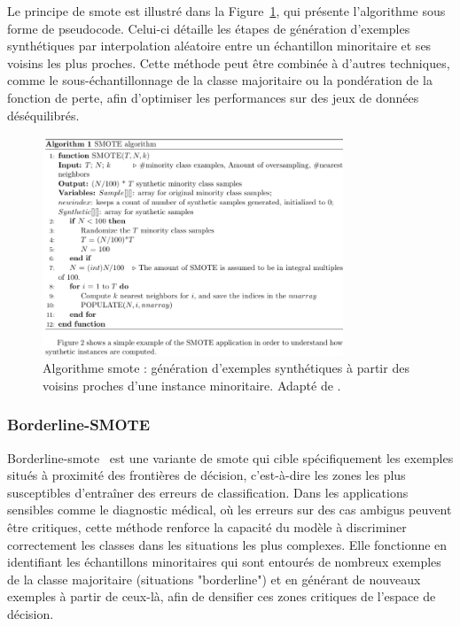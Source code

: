 \documentclass[12pt]{report}
\begin{document}
Le principe de \gls{smote} est illustré dans la Figure~\ref{fig:smote_algo}, qui présente l'algorithme sous forme de pseudocode. Celui-ci détaille les étapes de génération d'exemples synthétiques par interpolation aléatoire entre un échantillon minoritaire et ses voisins les plus proches. Cette méthode peut être combinée à d’autres techniques, comme le sous-échantillonnage de la classe majoritaire ou la pondération de la fonction de perte, afin d’optimiser les performances sur des jeux de données déséquilibrés.

\begin{figure}[H]
    \centering
    \includegraphics[width=0.8\textwidth]{smote.png}
    \caption{Algorithme \gls{smote} : génération d'exemples synthétiques à partir des voisins proches d'une instance minoritaire. Adapté de \cite{chawla2002smote}.}
    \label{fig:smote_algo}
\end{figure}

\subsubsection{Borderline-SMOTE}

Borderline-\gls{smote}~\cite{han2005borderline} est une variante de \gls{smote} qui cible spécifiquement les exemples situés à proximité des frontières de décision, c’est-à-dire les zones les plus susceptibles d’entraîner des erreurs de classification. Dans les applications sensibles comme le diagnostic médical, où les erreurs sur des cas ambigus peuvent être critiques, cette méthode renforce la capacité du modèle à discriminer correctement les classes dans les situations les plus complexes. Elle fonctionne en identifiant les échantillons minoritaires qui sont entourés de nombreux exemples de la classe majoritaire (situations "borderline") et en générant de nouveaux exemples à partir de ceux-là, afin de densifier ces zones critiques de l’espace de décision.
\end{document}
